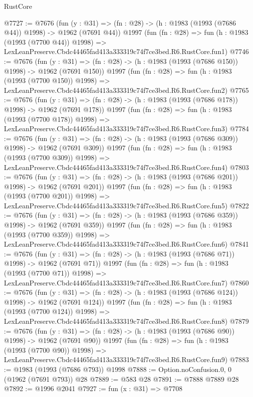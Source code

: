 \begin{lexlean}{RustCore}
\begin{coremodule}
@7727 := @7676
    (fun (y : @31) => (fn : @28) -> (h : @1983 (@1993 (@7686 @44)) @1998) -> @1962 (@7691 @44))
    @1997
    (fun (fn : @28) =>
    fun (h : @1983 (@1993 (@7700 @44)) @1998) =>
    LexLeanPreserve.Cbdc44465fad413a333319c74f7ce3bed.R6.RustCore.fun1)
@7746 := @7676
    (fun (y : @31) => (fn : @28) -> (h : @1983 (@1993 (@7686 @150)) @1998) -> @1962 (@7691 @150))
    @1997
    (fun (fn : @28) =>
    fun (h : @1983 (@1993 (@7700 @150)) @1998) =>
    LexLeanPreserve.Cbdc44465fad413a333319c74f7ce3bed.R6.RustCore.fun2)
@7765 := @7676
    (fun (y : @31) => (fn : @28) -> (h : @1983 (@1993 (@7686 @178)) @1998) -> @1962 (@7691 @178))
    @1997
    (fun (fn : @28) =>
    fun (h : @1983 (@1993 (@7700 @178)) @1998) =>
    LexLeanPreserve.Cbdc44465fad413a333319c74f7ce3bed.R6.RustCore.fun3)
@7784 := @7676
    (fun (y : @31) => (fn : @28) -> (h : @1983 (@1993 (@7686 @309)) @1998) -> @1962 (@7691 @309))
    @1997
    (fun (fn : @28) =>
    fun (h : @1983 (@1993 (@7700 @309)) @1998) =>
    LexLeanPreserve.Cbdc44465fad413a333319c74f7ce3bed.R6.RustCore.fun4)
@7803 := @7676
    (fun (y : @31) => (fn : @28) -> (h : @1983 (@1993 (@7686 @201)) @1998) -> @1962 (@7691 @201))
    @1997
    (fun (fn : @28) =>
    fun (h : @1983 (@1993 (@7700 @201)) @1998) =>
    LexLeanPreserve.Cbdc44465fad413a333319c74f7ce3bed.R6.RustCore.fun5)
@7822 := @7676
    (fun (y : @31) => (fn : @28) -> (h : @1983 (@1993 (@7686 @359)) @1998) -> @1962 (@7691 @359))
    @1997
    (fun (fn : @28) =>
    fun (h : @1983 (@1993 (@7700 @359)) @1998) =>
    LexLeanPreserve.Cbdc44465fad413a333319c74f7ce3bed.R6.RustCore.fun6)
@7841 := @7676
    (fun (y : @31) => (fn : @28) -> (h : @1983 (@1993 (@7686 @71)) @1998) -> @1962 (@7691 @71))
    @1997
    (fun (fn : @28) =>
    fun (h : @1983 (@1993 (@7700 @71)) @1998) =>
    LexLeanPreserve.Cbdc44465fad413a333319c74f7ce3bed.R6.RustCore.fun7)
@7860 := @7676
    (fun (y : @31) => (fn : @28) -> (h : @1983 (@1993 (@7686 @124)) @1998) -> @1962 (@7691 @124))
    @1997
    (fun (fn : @28) =>
    fun (h : @1983 (@1993 (@7700 @124)) @1998) =>
    LexLeanPreserve.Cbdc44465fad413a333319c74f7ce3bed.R6.RustCore.fun8)
@7879 := @7676
    (fun (y : @31) => (fn : @28) -> (h : @1983 (@1993 (@7686 @90)) @1998) -> @1962 (@7691 @90))
    @1997
    (fun (fn : @28) =>
    fun (h : @1983 (@1993 (@7700 @90)) @1998) =>
    LexLeanPreserve.Cbdc44465fad413a333319c74f7ce3bed.R6.RustCore.fun9)
@7883 := @1983 (@1993 (@7686 @793)) @1998
@7888 := Option.noConfusion.{0, 0} (@1962 (@7691 @793)) @28
@7889 := @583 @28
@7891 := @7888 @7889 @28
@7892 := @1996 @2041
@7927 := fun (x : @31) =>
  @7708

\end{coremodule}
\end{lexlean}

